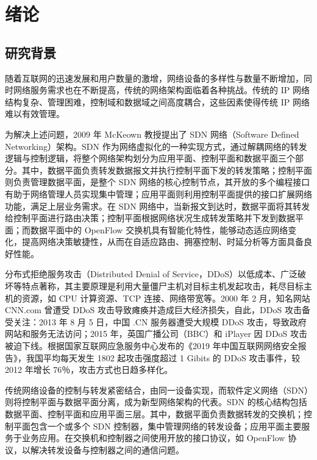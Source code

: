 
\chapter{绪论}%
\section{研究背景}
随着互联网的迅速发展和用户数量的激增，网络设备的多样性与数量不断增加，同时网络服务需求也在不断提高，传统的网络架构面临着各种挑战。传统的 IP 网络结构复杂、管理困难，控制域和数据域之间高度耦合，这些因素使得传统 IP 网络难以有效管理。

为解决上述问题，2009 年 McKeown 教授提出了 SDN 网络（Software Defined Networking）架构。SDN 作为网络虚拟化的一种实现方式，通过解耦网络的转发逻辑与控制逻辑，将整个网络架构划分为应用平面、控制平面和数据平面三个部分。其中，数据平面负责转发数据报文并执行控制平面下发的转发策略；控制平面则负责管理数据平面，是整个 SDN 网络的核心控制节点，其开放的多个编程接口有助于网络管理人员实现集中管理；应用平面则利用控制平面提供的接口扩展网络功能，满足上层业务需求。在 SDN 网络中，当新报文到达时，数据平面将其转发给控制平面进行路由决策；控制平面根据网络状况生成转发策略并下发到数据平面；而数据平面中的 OpenFlow 交换机具有智能化特性，能够动态适应网络变化，提高网络决策敏捷性，从而在自适应路由、拥塞控制、时延分析等方面具备良好性能。

分布式拒绝服务攻击（Distributed Denial of Service，DDoS）以低成本、广泛破坏等特点著称，其主要原理是利用大量僵尸主机对目标主机发起攻击，耗尽目标主机的资源，如 CPU 计算资源、TCP 连接、网络带宽等。2000 年 2 月，知名网站 CNN.com 曾遭受 DDoS 攻击导致瘫痪并造成巨大经济损失，自此，DDoS 攻击备受关注：2013 年 8 月 5 日，中国 .CN 服务器遭受大规模 DDoS 攻击，导致政府网站和服务无法访问；2015 年，英国广播公司（BBC）和 iPlayer 因 DDoS 攻击被迫下线。根据国家互联网应急服务中心发布的《2019 年中国互联网网络安全报告》，我国平均每天发生 1802 起攻击强度超过 1 Gibits 的 DDoS 攻击事件，较 2012 年增长 76％，攻击方式也日趋多样化。

传统网络设备的控制与转发紧密结合，由同一设备实现，而软件定义网络（SDN）则将控制平面与数据平面分离，成为新型网络架构的代表。SDN 的核心结构包括数据平面、控制平面和应用平面三层。其中，数据平面负责数据转发的交换机；控制平面包含一个或多个 SDN 控制器，集中管理网络的转发设备；应用平面主要服务于业务应用。在交换机和控制器之间使用开放的接口协议，如 OpenFlow 协议，以解决转发设备与控制器之间的通信问题。

